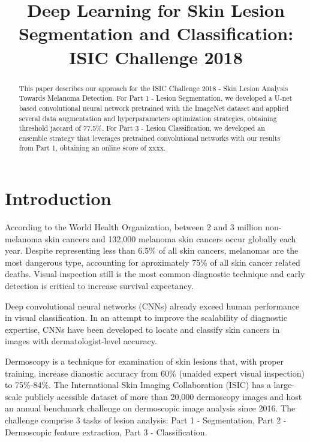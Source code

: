 \documentclass[conference]{IEEEtran}
\begin{document}
\title{Deep Learning for Skin Lesion Segmentation and Classification: ISIC Challenge 2018}

\author{
}

\maketitle


\begin{abstract}
This paper describes our approach for the ISIC Challenge 2018 - Skin Lesion Analysis Towards Melanoma Detection. For Part 1 - Lesion Segmentation, we developed a U-net based convolutional neural network pretrained with the ImageNet dataset\cite{imagenet} and applied several data augmentation and hyperparameters optimization strategies, obtaining threshold jaccard of 77.5\%. For Part 3 - Lesion Classification, we developed an ensemble strategy that leverages pretrained convolutional networks with our results from Part 1, obtaining an online score of xxxx. 
\end{abstract}

\section{Introduction}

According to the World Health Organization, between 2 and 3 million non-melanoma skin cancers and 132,000 melanoma skin cancers occur globally each year\cite{who}. Despite representing less than 6.5\% of all skin cancers, melanomas are the most dangerous type, accounting for aproximately 75\% of all skin cancer related deaths\cite{who, nature}.  Visual inspection still is the most common diagnostic technique and early detection is critical to increase survival expectancy.

Deep convolutional neural networks (CNNs) already exceed human performance in visual classification\cite{fei}.  In an attempt to improve the scalability of diagnostic expertise, CNNs have been developed to locate and classify skin cancers in images with dermatologist-level accuracy\cite{nature}.

Dermoscopy is a technique for examination of skin lesions that, with proper training, increase dianostic accuracy from 60\% (unaided expert visual inspection) to 75\%-84\%\cite{isic}. The International Skin Imaging Collaboration (ISIC) has a large-scale publicly acessible dataset of more than 20,000 dermoscopy images and host an annual benchmark challenge on dermoscopic image analysis since 2016.  The challenge comprise 3 tasks of lesion analysis: Part 1 - Segmentation, Part 2 - Dermoscopic feature extraction, Part 3 - Classification. 
\end{document}

